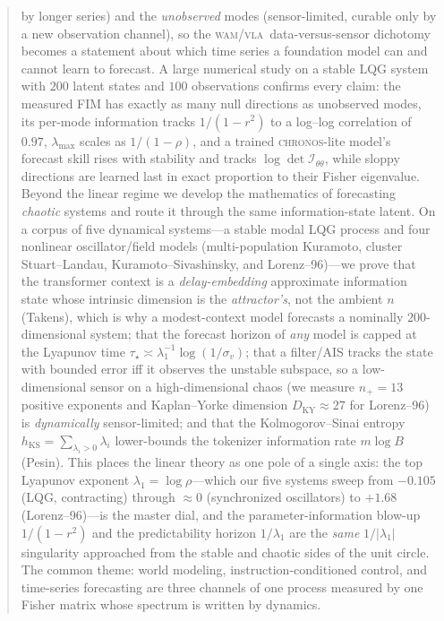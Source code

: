 \documentclass[10pt]{article}
\theoremstyle{plain}
\theoremstyle{definition}
\theoremstyle{remark}
\newcommand{\Fisher}{\mathcal{I}}
\newcommand{\Ith}{\Fisher_{\theta\theta}}
\newcommand{\WAM}{\textsc{wam}}
\newcommand{\VLA}{\textsc{vla}}
\newcommand{\Chronos}{\textsc{chronos}}
\newcommand{\hKS}{h_{\mathrm{KS}}}
\newcommand{\DKY}{D_{\mathrm{KY}}}
\begin{document}
\begin{abstract}
by longer series) and the \emph{unobserved} modes (sensor-limited, curable only
by a new observation channel), so the \WAM/\VLA\ data-versus-sensor dichotomy
becomes a statement about which time series a foundation model can and cannot
learn to forecast. A large numerical study on a stable LQG system with $200$
latent states and $100$ observations confirms every claim: the measured FIM has
exactly as many null directions as unobserved modes, its per-mode information
tracks $1/(1-r^2)$ to a log--log correlation of $0.97$, $\lambda_{\max}$ scales
as $1/(1-\rho)$, and a trained \Chronos-lite model's forecast skill rises with
stability and tracks $\log\det\Ith$, while sloppy directions are learned last in
exact proportion to their Fisher eigenvalue. Beyond the linear regime we develop
the mathematics of forecasting \emph{chaotic} systems and route it through the
same information-state latent. On a corpus of five dynamical systems---a stable
modal LQG process and four nonlinear oscillator/field models (multi-population
Kuramoto, cluster Stuart--Landau, Kuramoto--Sivashinsky, and Lorenz--96)---we
prove that the transformer context is a \emph{delay-embedding} approximate
information state whose intrinsic dimension is the \emph{attractor's}, not the
ambient $n$ (Takens), which is why a modest-context model forecasts a nominally
$200$-dimensional system; that the forecast horizon of \emph{any} model is capped
at the Lyapunov time $\tau_\star\asymp\lambda_1^{-1}\log(1/\sigma_v)$; that a
filter/AIS tracks the state with bounded error iff it observes the unstable
subspace, so a low-dimensional sensor on a high-dimensional chaos (we measure
$n_+\!=\!13$ positive exponents and Kaplan--Yorke dimension $\DKY\!\approx\!27$
for Lorenz--96) is \emph{dynamically} sensor-limited; and that the
Kolmogorov--Sinai entropy $\hKS=\sum_{\lambda_i>0}\lambda_i$ lower-bounds the
tokenizer information rate $m\log B$ (Pesin). This places the linear theory as one
pole of a single axis: the top Lyapunov exponent $\lambda_1=\log\rho$---which our
five systems sweep from $-0.105$ (LQG, contracting) through $\approx0$
(synchronized oscillators) to $+1.68$ (Lorenz--96)---is the master dial, and the
parameter-information blow-up $1/(1-r^2)$ and the predictability horizon
$1/\lambda_1$ are the \emph{same} $1/|\lambda_1|$ singularity approached from the
stable and chaotic sides of the unit circle. The common theme: world modeling,
instruction-conditioned control, and time-series forecasting are three channels
of one process measured by one Fisher matrix whose spectrum is written by
dynamics.
\end{abstract}
\end{document}
